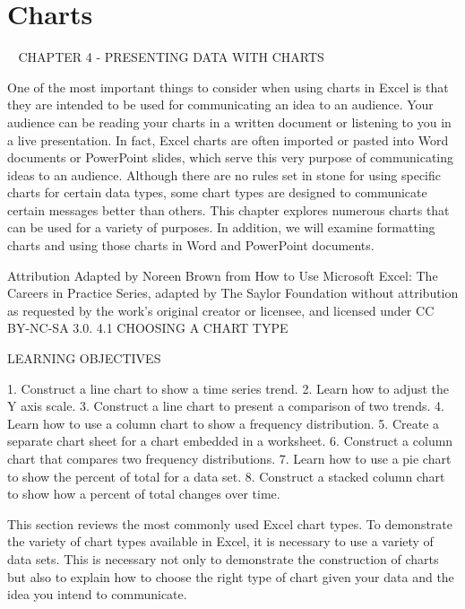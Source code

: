 \chapter{Charts}\label{ch04:charts}

                CHAPTER 4 - PRESENTING DATA WITH CHARTS



One of the most important things to consider when using charts in Excel is that they are intended
to be used for communicating an idea to an audience. Your audience can be reading your charts in a
written document or listening to you in a live presentation. In fact, Excel charts are often imported or
pasted into Word documents or PowerPoint slides, which serve this very purpose of communicating
ideas to an audience. Although there are no rules set in stone for using specific charts for certain
data types, some chart types are designed to communicate certain messages better than others. This
chapter explores numerous charts that can be used for a variety of purposes. In addition, we will
examine formatting charts and using those charts in Word and PowerPoint documents.


Attribution
Adapted by Noreen Brown from How to Use Microsoft Excel: The Careers in Practice Series, adapted
by The Saylor Foundation without attribution as requested by the work’s original creator or
licensee, and licensed under CC BY-NC-SA 3.0.
4.1 CHOOSING A CHART TYPE




LEARNING OBJECTIVES


1. Construct a line chart to show a time series trend.
2. Learn how to adjust the Y axis scale.
3. Construct a line chart to present a comparison of two trends.
4. Learn how to use a column chart to show a frequency distribution.
5. Create a separate chart sheet for a chart embedded in a worksheet.
6. Construct a column chart that compares two frequency distributions.
7. Learn how to use a pie chart to show the percent of total for a data set.
8. Construct a stacked column chart to show how a percent of total changes over time.



This section reviews the most commonly used Excel chart types. To demonstrate the variety of chart
types available in Excel, it is necessary to use a variety of data sets. This is necessary not only to
demonstrate the construction of charts but also to explain how to choose the right type of chart given
your data and the idea you intend to communicate.

